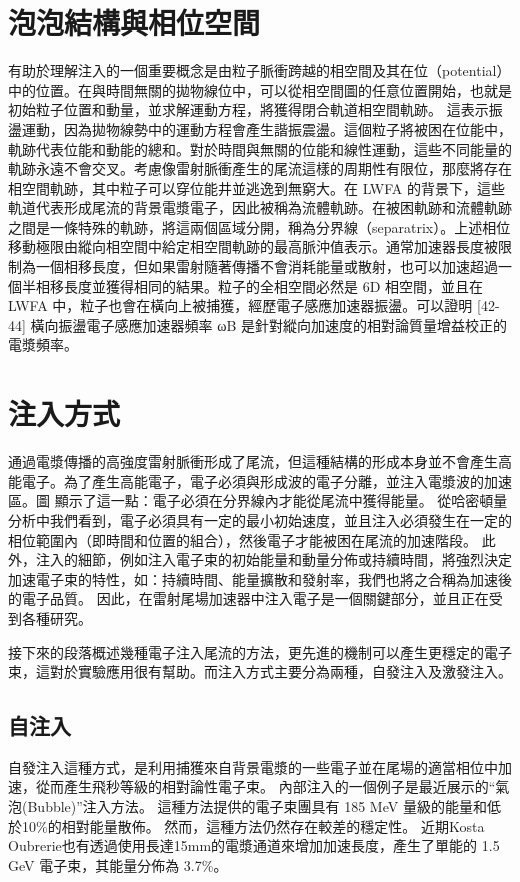 \section{泡泡結構與相位空間}%
有助於理解注入的一個重要概念是由粒子脈衝跨越的相空間及其在位（potential）中的位置。在與時間無關的拋物線位中，可以從相空間圖的任意位置開始，也就是初始粒子位置和動量，並求解運動方程，將獲得閉合軌道相空間軌跡。
這表示振盪運動，因為拋物線勢中的運動方程會產生諧振震盪。這個粒子將被困在位能中，軌跡代表位能和動能的總和。對於時間與無關的位能和線性運動，這些不同能量的軌跡永遠不會交叉。考慮像雷射脈衝產生的尾流這樣的周期性有限位，那麼將存在相空間軌跡，其中粒子可以穿位能井並逃逸到無窮大。在 LWFA 的背景下，這些軌道代表形成尾流的背景電漿電子，因此被稱為流體軌跡。在被困軌跡和流體軌跡之間是一條特殊的軌跡，將這兩個區域分開，稱為分界線（separatrix）。上述相位移動極限由縱向相空間中給定相空間軌跡的最高脈沖值表示。通常加速器長度被限制為一個相移長度，但如果雷射隨著傳播不會消耗能量或散射，也可以加速超過一個半相移長度並獲得相同的結果。粒子的全相空間必然是 6D 相空間，並且在 LWFA 中，粒子也會在橫向上被捕獲，經歷電子感應加速器振盪。可以證明 [42-44] 橫向振盪電子感應加速器頻率 ωB 是針對縱向加速度的相對論質量增益校正的電漿頻率。
\section{注入方式}
通過電漿傳播的高強度雷射脈衝形成了尾流，但這種結構的形成本身並不會產生高能電子。為了產生高能電子，電子必須與形成波的電子分離，並注入電漿波的加速區。圖 顯示了這一點：電子必須在分界線內才能從尾流中獲得能量。 從哈密頓量分析中我們看到，電子必須具有一定的最小初始速度，並且注入必須發生在一定的相位範圍內（即時間和位置的組合），然後電子才能被困在尾流的加速階段。 此外，注入的細節，例如注入電子束的初始能量和動量分佈或持續時間，將強烈決定加速電子束的特性，如：持續時間、能量擴散和發射率，我們也將之合稱為加速後的電子品質。 因此，在雷射尾場加速器中注入電子是一個關鍵部分，並且正在受到各種研究。

接下來的段落概述幾種電子注入尾流的方法，更先進的機制可以產生更穩定的電子束，這對於實驗應用很有幫助。而注入方式主要分為兩種，自發注入及激發注入。

 \subsection{自注入}
自發注入這種方式，是利用捕獲來自背景電漿的一些電子並在尾場的適當相位中加速，從而產生飛秒等級的相對論性電子束。
內部注入的一個例子是最近展示的“氣泡(Bubble)”注入方法\cite{Wang_2018}。 這種方法提供的電子束團具有 185 MeV 量級的能量和低於10\%的相對能量散佈。 然而，這種方法仍然存在較差的穩定性。
近期Kosta Oubrerie也有透過使用長達15mm的電漿通道來增加加速長度，產生了單能的 1.5 GeV 電子束，其能量分佈為 3.7\%。\cite{cite-key}
